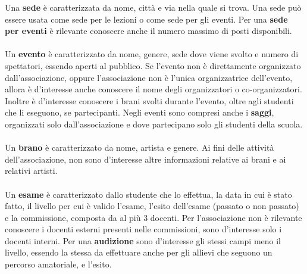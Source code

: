 \documentclass[12pt]{article}
\begin{document}
	Una \textbf{sede} è caratterizzata da nome, città e via nella quale si trova. Una sede può essere usata come sede per le lezioni o come sede per gli eventi. Per una \textbf{sede per eventi} è rilevante conoscere anche il numero massimo di posti disponibili.\\\\
	Un \textbf{evento} è caratterizzato da nome, genere, sede dove viene svolto e numero di spettatori, essendo aperti al pubblico. Se l'evento non è direttamente organizzato dall'associazione, oppure l'associazione non è l'unica organizzatrice dell'evento, allora è d'interesse anche conoscere il nome degli organizzatori o co-organizzatori. Inoltre è d'interesse conoscere i brani svolti durante l'evento, oltre agli studenti che li eseguono, se partecipanti. Negli eventi sono compresi anche i \textbf{saggi}, organizzati solo dall'associazione e dove partecipano solo gli studenti della scuola.\\\\
	Un \textbf{brano} è caratterizzato da nome, artista e genere. Ai fini delle attività dell'associazione, non sono d'interesse altre informazioni relative ai brani e ai relativi artisti.\\\\
	Un \textbf{esame} è caratterizzato dallo studente che lo effettua, la data in cui è stato fatto, il livello per cui è valido l'esame, l'esito dell'esame (passato o non passato) e la commissione, composta da al più 3 docenti. Per l'associazione non è rilevante conoscere i docenti esterni presenti nelle commissioni, sono d'interesse solo i docenti interni. Per una \textbf{audizione} sono d'interesse gli stessi campi meno il livello, essendo la stessa da effettuare anche per gli allievi che seguono un percorso amatoriale, e l'esito.
\end{document}
